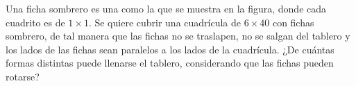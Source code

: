 Una ficha sombrero es una como la que se muestra en la figura, donde cada cuadrito es de $1 \times  1$. Se quiere cubrir una cuadrícula de $6 \times  40$ con fichas sombrero, de tal manera que las fichas no se traslapen, no se salgan del tablero y los lados de las fichas sean paralelos a los lados de la cuadrícula. ¿De cuántas formas distintas puede llenarse el tablero, considerando que las fichas pueden rotarse?